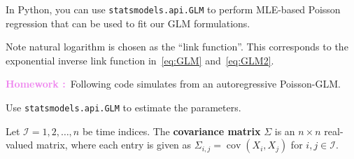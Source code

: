 \documentclass[a4paper,11pt]{exam}
\newif\ifMATLAB %
\DeclareMathOperator*{\cov}{cov}
\newcounter{homework}
\newcommand{\homework}{\stepcounter{homework}\textcolor{violet}{\textbf{Homework \thehomework:}~}}
\begin{document}
\begin{questions}
\ifMATLAB
In MATLAB, you can use \texttt{glmfit} and \texttt{glmval} to perform MLE-based Poisson regression that can be used to fit our GLM formulations.


\else
In Python, you can use \texttt{statsmodels.api.GLM} to perform MLE-based Poisson regression that can be used to fit our GLM formulations.

%
\fi

Note natural logarithm is chosen as the ``link function''. This corresponds to the exponential inverse link function in~\eqref{eq:GLM} and~\eqref{eq:GLM2}.

\question \homework Following code simulates from an autoregressive Poisson-GLM.
\ifMATLAB
    Use \texttt{glmfit} to estimate the parameters.
    
\else
    Use \texttt{statsmodels.api.GLM} to estimate the parameters.
\fi



\newpage
\question Let $\mathcal{I} = {1, 2, \ldots, n}$ be time indices. The \textbf{covariance matrix} $\Sigma$ is an $n \times n$ real-valued matrix, where each entry is given as $\Sigma_{i,j} = \cov(X_i, X_j)$ for $i, j \in \mathcal{I}$.
\end{questions}
\end{document}
